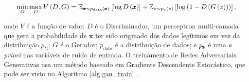 \begin{equation}
    \min_{G} \max_{D} V\left(D, G\right) = \mathbb{E}_{\pmb{x}\thicksim p_{\text{data}}\left(\pmb{x}\right)}\left[\log D\left(\pmb{x}\right)\right] + \mathbb{E}_{z\thicksim p_{z}\left(z\right)}\left[\log \left(1 - D\left(G\left(z\right)\right)\right)\right],
    \label{eq:minimax}
    \vspace{0.2cm}
\end{equation}

\noindent onde $V$ é a função de valor; $D$ é o Discriminador, um perceptron multi-camada que gera a probabilidade de $\pmb{x}$ ter sido originado dos dados legítimos em vez da distribuição $p_{G}$; $G$ é o Gerador; $p_{\text{data}}$ é a distribuição de dados; e $p_{\text{\pmb{z}}}$ é uma \textit{a priori} nas variáveis de ruído de entrada. O treinamento de Redes Adversariais Generativas usa um método baseado em Gradiente Descendente Estocástico, que pode ser visto no Algoritmo \ref{alg:gan_train} \citep{NIPS2014_5423}.


